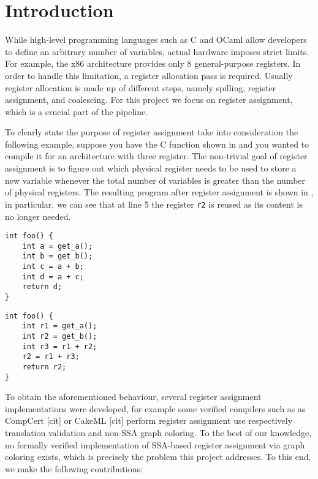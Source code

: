 
\chapter{Introduction}
\label{cha:intro}

While high-level programming languages such as C and OCaml allow developers to define an arbitrary number of variables, actual hardware imposes strict limits. For example, the x86 architecture provides only 8 general-purpose registers.
In order to handle this limitation, a register allocation pass is required. Usually register allocation is made up of different steps, namely spilling, register assignment, and coalescing. For this project we focus on register assignment, which is a crucial part of the pipeline.

To clearly state the purpose of register assignment take into consideration the following example, suppose you have the C function shown in  and you wanted to compile it for an architecture with three register. The non-trivial goal of register assignment is to figure out which physical register needs to be used to store a new variable whenever the total number of variables is greater than the number of physical registers. The resulting program after register assignment is shown in , in particular, we can see that at line 5 the register \texttt{r2} is reused as its content is no longer needed.

\begin{minipage}{0.48\linewidth}
\centering
\lstset{style=C}
\begin{lstlisting}[caption={Original C program.}, label={fig:cbefore}]
int foo() {
    int a = get_a();
    int b = get_b();
    int c = a + b;
    int d = a + c;
    return d;
}
\end{lstlisting}
\end{minipage}
\hfill
\begin{minipage}{0.48\linewidth}
\centering
\lstset{style=C}
\begin{lstlisting}[caption={Same C program after register assignment.}, label={fig:cafter}]
int foo() {
    int r1 = get_a();
    int r2 = get_b();
    int r3 = r1 + r2;
    r2 = r1 + r3;
    return r2;
}
\end{lstlisting}
\end{minipage}

To obtain the aforementioned behaviour, several register assignment implementations were developed, for example some verified compilers such as as CompCert [cit] or CakeML [cit] perform register assignment use respectively translation validation and non-SSA graph coloring.
To the best of our knowledge, no formally verified implementation of SSA-based register assignment via graph coloring exists, which is precisely the problem this project addresses. To this end, we make the following contributions:

